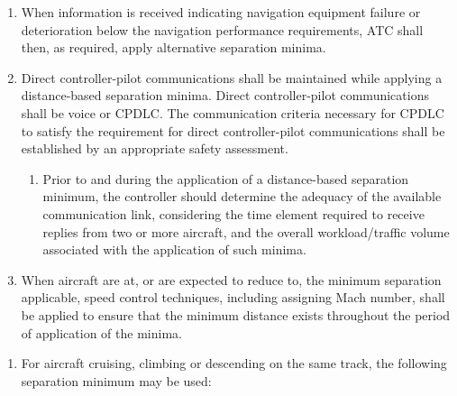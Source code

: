\begin{enumeratesc}
\begin{enumerate}
        \begin{enumerate}
            \item When information is received indicating navigation equipment failure or deterioration below the navigation performance requirements, ATC shall then, as required, apply alternative separation minima.
            \item Direct controller-pilot communications shall be maintained while applying a distance-based separation minima. Direct controller-pilot communications shall be voice or CPDLC. The communication criteria necessary for CPDLC to satisfy the requirement for direct controller-pilot communications shall be established by an appropriate safety assessment.
            \begin{enumerate}
                \item Prior to and during the application of a distance-based separation minimum, the controller should determine the adequacy of the available communication link, considering the time element required to receive replies from two or more aircraft, and the overall workload/traffic volume associated with the application of such minima.
            \end{enumerate}
            \item When aircraft are at, or are expected to reduce to, the minimum separation applicable, speed control techniques, including assigning Mach number, shall be applied to ensure that the minimum distance exists throughout the period of application of the minima.
        \end{enumerate}

        \begin{enumerate}
            \item For aircraft cruising, climbing or descending on the same track, the following separation minimum may be used:
            

\end{enumerate}
\end{enumerate}
\end{enumeratesc}
